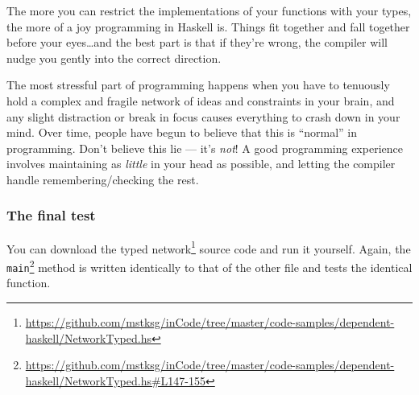 \documentclass[]{article}
\newenvironment{Shaded}{}{}
\newcommand{\KeywordTok}[1]{\textcolor[rgb]{0.00,0.44,0.13}{\textbf{{#1}}}}
\newcommand{\CommentTok}[1]{\textcolor[rgb]{0.38,0.63,0.69}{\textit{{#1}}}}
\newcommand{\NormalTok}[1]{{#1}}
\renewcommand{\href}[2]{#2\footnote{\url{#1}}}
\begin{document}
The more you can restrict the implementations of your functions with your types,
the more of a joy programming in Haskell is. Things fit together and fall
together before your eyes\ldots{}and the best part is that if they're wrong, the
compiler will nudge you gently into the correct direction.

The most stressful part of programming happens when you have to tenuously hold a
complex and fragile network of ideas and constraints in your brain, and any
slight distraction or break in focus causes everything to crash down in your
mind. Over time, people have begun to believe that this is ``normal'' in
programming. Don't believe this lie --- it's \emph{not}! A good programming
experience involves maintaining as \emph{little} in your head as possible, and
letting the compiler handle remembering/checking the rest.

\subsubsection{The final test}\label{the-final-test}

You can download the
\href{https://github.com/mstksg/inCode/tree/master/code-samples/dependent-haskell/NetworkTyped.hs}{typed
network} source code and run it yourself. Again, the
\href{https://github.com/mstksg/inCode/tree/master/code-samples/dependent-haskell/NetworkTyped.hs\#L147-155}{\texttt{main}}
method is written identically to that of the other file and tests the identical
function.

\begin{Shaded}
\end{Shaded}
\end{document}
